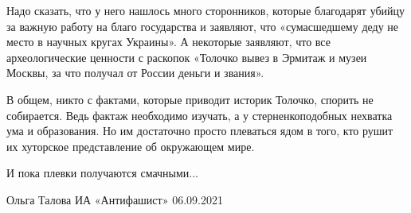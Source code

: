 Надо сказать, что у него нашлось много сторонников, которые благодарят убийцу
за важную работу на благо государства и заявляют, что «сумасшедшему деду не
место в научных кругах Украины». А некоторые заявляют, что все археологические
ценности с раскопок «Толочко вывез в Эрмитаж и музеи Москвы, за что получал от
России деньги и звания».

В общем, никто с фактами, которые приводит историк Толочко, спорить не
собирается. Ведь фактаж необходимо изучать, а у стерненкоподобных нехватка ума
и образования. Но им достаточно просто плеваться ядом в того, кто рушит их
хуторское представление об окружающем мире. 

И пока плевки получаются смачными...

Ольга Талова
ИА «Антифашист»
06.09.2021
